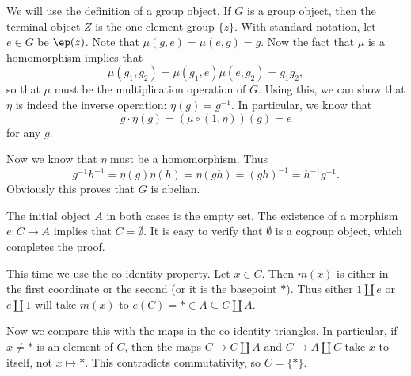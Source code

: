 \documentclass[../../solutions.tex]{subfiles}
\begin{document}
\begin{exercise} \leavevmode
We will use the definition of a group object.
If $G$ is a group object, then the terminal object $Z$ is the one-element group $\{z\}$.
With standard notation, let $e\in G$ be $\ep(z)$.
Note that $\mu(g,e)=\mu(e,g)=g$.
Now the fact that $\mu$ is a homomorphism implies that
\[\mu(g_1,g_2)=\mu(g_1,e)\mu(e,g_2)=g_1g_2,\]
so that $\mu$ must be the multiplication operation of $G$.
Using this, we can show that $\eta$ is indeed the inverse operation: $\eta(g)=g^{-1}$.
In particular, we know that
\[g\cdot\eta(g)=(\mu\circ(1,\eta))(g)=e\]
for any $g$.

Now we know that $\eta$ must be a homomorphism.
Thus
\[g^{-1}h^{-1}=\eta(g)\eta(h)=\eta(gh)=(gh)^{-1}=h^{-1}g^{-1}.\]
Obviously this proves that $G$ is abelian.
\end{exercise}

\begin{exercise} \leavevmode
The initial object $A$ in both cases is the empty set.
The existence of a morphism $e:C\to A$ implies that $C=\emptyset$.
It is easy to verify that $\emptyset$ is a cogroup object, which completes the proof.
\end{exercise}

\begin{exercise} \leavevmode
This time we use the co-identity property.
Let $x\in C$.
Then $m(x)$ is either in the first coordinate or the second (or it is the basepoint $*$).
Thus either $1\amalg e$ or $e\amalg 1$ will take $m(x)$ to $e(C)=*\in A\subseteq C\amalg A$.

Now we compare this with the maps in the co-identity triangles.
In particular, if $x\ne*$ is an element of $C$, then the maps $C\to C\amalg A$ and $C\to A\amalg C$ take $x$ to itself, not $x\mapsto*$.
This contradicts commutativity, so $C=\{*\}$.
\end{exercise}
\end{document}
